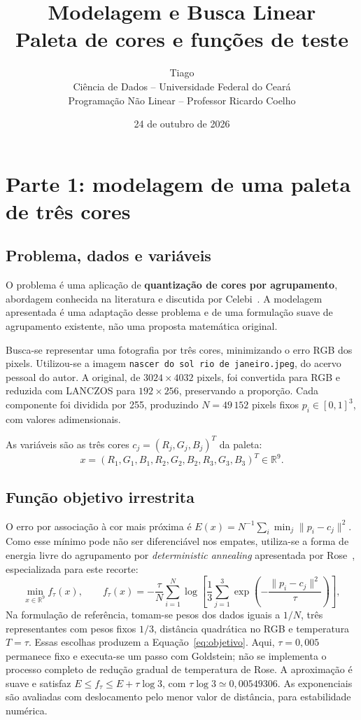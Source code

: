 \documentclass[12pt,a4paper]{article}
\title{Modelagem e Busca Linear\\Paleta de cores e funções de teste}
\author{Tiago\\Ciência de Dados -- Universidade Federal do Ceará\\
Programação Não Linear -- Professor Ricardo Coelho}
\date{24 de outubro de 2026}
\begin{document}
\maketitle

\section{Parte 1: modelagem de uma paleta de três cores}

\subsection{Problema, dados e variáveis}
O problema é uma aplicação de \textbf{quantização de cores por agrupamento},
abordagem conhecida na literatura e discutida por Celebi~\cite{celebi2011}.
A modelagem apresentada é uma adaptação desse problema e de uma formulação
suave de agrupamento existente, não uma proposta matemática original.

Busca-se representar uma fotografia por três cores, minimizando o erro RGB
dos pixels. Utilizou-se a imagem \texttt{nascer do sol rio de janeiro.jpeg},
do acervo pessoal do autor. A original, de $3024\times4032$ pixels, foi
convertida para RGB e reduzida com LANCZOS para $192\times256$, preservando
a proporção. Cada componente foi dividida por 255, produzindo
$N=49\,152$ pixels fixos $p_i\in[0,1]^3$, com valores adimensionais.

As variáveis são as três cores $c_j=(R_j,G_j,B_j)^T$ da paleta:
\[
x=(R_1,G_1,B_1,R_2,G_2,B_2,R_3,G_3,B_3)^T\in\mathbb{R}^9.
\]

\subsection{Função objetivo irrestrita}
O erro por associação à cor mais próxima é
$E(x)=N^{-1}\sum_i\min_j\|p_i-c_j\|^2$.
Como esse mínimo pode não ser diferenciável nos empates, utiliza-se a forma
de energia livre do agrupamento por \textit{deterministic annealing}
apresentada por Rose~\cite[eq.~(25)]{rose1998}, especializada para este recorte:
\begin{equation}
\min_{x\in\mathbb{R}^9} f_\tau(x),\qquad
f_\tau(x)=-\frac{\tau}{N}\sum_{i=1}^N
\log\left[\frac13\sum_{j=1}^3
\exp\left(-\frac{\|p_i-c_j\|^2}{\tau}\right)\right],
\label{eq:objetivo}
\end{equation}
Na formulação de referência, tomam-se pesos dos dados iguais a $1/N$,
três representantes com pesos fixos $1/3$, distância quadrática no RGB
e temperatura $T=\tau$. Essas escolhas produzem a
Equação~\ref{eq:objetivo}. Aqui, $\tau=0{,}005$ permanece fixo e executa-se
um passo com Goldstein; não se implementa o processo completo de
redução gradual de temperatura de Rose. A aproximação é suave e satisfaz
$E\leq f_\tau\leq E+\tau\log3$, com
$\tau\log3\simeq0{,}00549306$. As exponenciais são avaliadas com
deslocamento pelo menor valor de distância, para estabilidade numérica.
\end{document}

